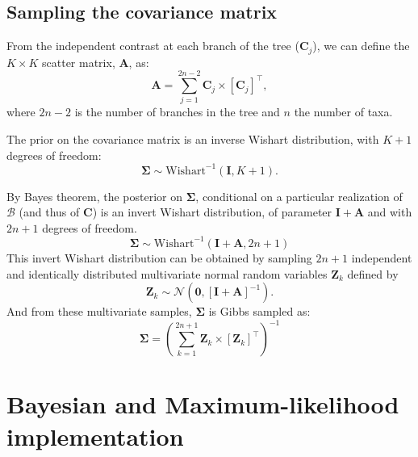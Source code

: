 \documentclass{article}
\newcommand{\MultiplyMatrix}{\times}
\newcommand{\UniDimArray}[1]{\bm{#1}}
\newcommand{\BiDimArray}[1]{\bm{#1}}
\newcommand{\tr}{^{\intercal}}
\newcommand{\inv}{^{-1}}
\newcommand{\NbrTaxa}{n}
\newcommand{\VecZero}{\UniDimArray{0}}
\newcommand{\Nbranch}{2 \NbrTaxa - 2}
\newcommand{\WishartPostDf}{2 \NbrTaxa + 1}
\newcommand{\Ntrait}{K}
\newcommand{\contrast}{\UniDimArray{C}}
\newcommand{\Covariancematrix}{\Sigma}
\newcommand{\CovarianceMatrix}{\BiDimArray{\Covariancematrix}}
\newcommand{\Identitymatrix}{\BiDimArray{I}}
\newcommand{\brownian}{\mathcal{B}}
\newcommand{\Brownian}{\UniDimArray{\brownian}}
\newcommand{\Scattermatrix}{\BiDimArray{A}}
\newcommand{\Multivariate}{\UniDimArray{Z}}
\begin{document}
\subsection{Sampling the covariance matrix}\label{subsec:sampling-the-covariance-matrix}
From the independent contrast at each branch of the tree ($\contrast_{j}$), we can define the $\Ntrait \times \Ntrait$ scatter matrix, $\Scattermatrix$, as:
\begin{equation}
    \Scattermatrix = \sum\limits_{j=1}^{\Nbranch} \contrast_{j} \MultiplyMatrix \left[\contrast_{j}\right]\tr\label{eq:bayes-scatter},
\end{equation}
where $\Nbranch$ is the number of branches in the tree and $\NbrTaxa$ the number of taxa.

The {prior} on the covariance matrix is an inverse Wishart distribution, with $\Ntrait + 1$ degrees of freedom:
\begin{equation}
    \label{eq:Distribcovariance}
    \CovarianceMatrix \sim \text{Wishart}^{-1} (\Identitymatrix, \Ntrait + 1).
\end{equation}

By Bayes theorem, the {posterior} on $\CovarianceMatrix$, conditional on a particular realization of $\Brownian$ (and thus of $\contrast$) is an invert Wishart distribution, of parameter $\Identitymatrix + \Scattermatrix$ and with $\WishartPostDf$ degrees of freedom.
\begin{equation}
    \CovarianceMatrix \sim \text{Wishart}^{-1}\left( \Identitymatrix + \Scattermatrix, \WishartPostDf\right)\label{eq:bayes-posterior}
\end{equation}
This invert Wishart distribution can be obtained by sampling $\WishartPostDf$ independent and identically distributed multivariate normal random variables $\Multivariate_{k}$ defined by
\begin{equation}
    \Multivariate_{k} \sim \mathcal{N} \left( \VecZero, \left[ \Identitymatrix + \Scattermatrix\right]^{-1} \right).\label{eq:bayes-multivariate}
\end{equation}
And from these multivariate samples, $\CovarianceMatrix$ is Gibbs sampled as:
\begin{equation}
    \CovarianceMatrix = \left( \sum\limits_{k=1}^{\WishartPostDf} \Multivariate_{k} \MultiplyMatrix  \left[\Multivariate_{k} \right] \tr \right)\inv \label{eq:bayes-gibbs}
\end{equation}

\newpage
\section{Bayesian and Maximum-likelihood implementation}\label{sec:implementation}
\end{document}
